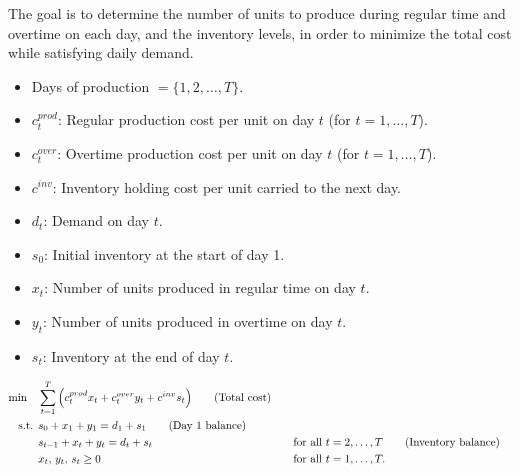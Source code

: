 The goal is to determine the number of units to produce during regular time and overtime on each day, and the inventory levels, in order to minimize the total cost while satisfying daily demand.

\bigskip

\begin{itemize}
    \item Days of production \( = \{1, 2, \dots, T\}\).
\end{itemize}

\begin{itemize}
    \item \(c^{prod}_t\): Regular production cost per unit on day \(t\) (for \(t=1,\dots,T\)).
    \item \(c^{over}_{t}\): Overtime production cost per unit on day \(t\) (for \(t=1,\dots,T\)).
    \item \(c^{inv}\): Inventory holding cost per unit carried to the next day.
    \item \(d_t\): Demand on day \(t\).
    \item \(s_0\): Initial inventory at the start of day 1.
\end{itemize}

\begin{itemize}
    \item \(x_t\): Number of units produced in regular time on day \(t\).
    \item \(y_t\): Number of units produced in overtime on day \(t\).
    \item \(s_t\): Inventory at the end of day \(t\).
\end{itemize}

\begin{align*}
\min \quad & \sum_{t=1}^{T} \Big( c^{prod}_t x_t + c^{over}_{t} y_t + c^{inv} s_t \Big)   \tag{Total cost} \\
\mbox{ s.t. }        & s_0 + x_1 + y_1 = d_1 + s_1   \tag{Day 1 balance} \\
             & s_{t-1} + x_t + y_t = d_t + s_t &&\quad \mbox{for all } t = 2,\dots,T   \tag{Inventory balance} \\
             & x_t,\, y_t,\, s_t \ge 0 &&\quad \mbox{for all } t = 1,\dots,T.
\end{align*}

\newpage

